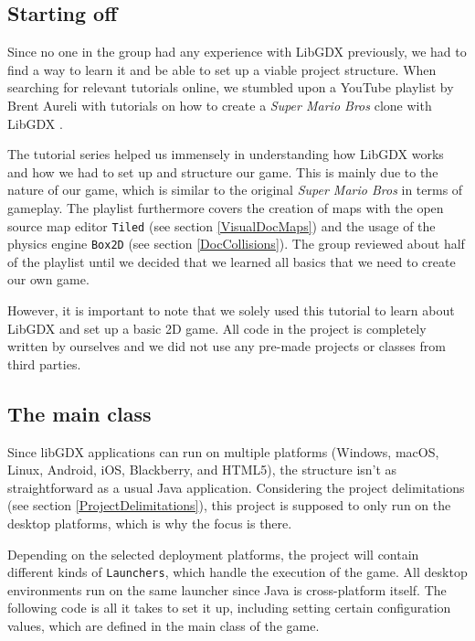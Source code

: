 \documentclass[12p]{article}
\begin{document}

\newpage
\subsection{Starting off}

Since no one in the group had any experience with LibGDX previously, we had to find a way to learn it and be able to set up a viable project structure. When searching for relevant tutorials online, we stumbled upon a YouTube playlist by Brent Aureli with tutorials on how to create a \emph{Super Mario Bros} \cite{SuperMarioBros} clone with LibGDX \cite{BrentAureliSuperMarioBros}.

The tutorial series helped us immensely in understanding how LibGDX works and how we had to set up and structure our game. This is mainly due to the nature of our game, which is similar to the original \emph{Super Mario Bros} in terms of gameplay. The playlist furthermore covers the creation of maps with the open source map editor \texttt{Tiled} (see section \ref{VisualDocMaps}) and the usage of the physics engine \texttt{Box2D} (see section \ref{DocCollisions}). The group reviewed about half of the playlist until we decided that we learned all basics that we need to create our own game.

However, it is important to note that we solely used this tutorial to learn about LibGDX and set up a basic 2D game. All code in the project is completely written by ourselves and we did not use any pre-made projects or classes from third parties.


\newpage
\subsection{The main class} \label{DocMainClass}

Since libGDX applications can run on multiple platforms (Windows, macOS, Linux, Android, iOS, Blackberry, and HTML5), the structure isn't as straightforward as a usual Java application. Considering the project delimitations (see section \ref{ProjectDelimitations}), this project is supposed to only run on the desktop platforms, which is why the focus is there.

Depending on the selected deployment platforms, the project will contain different kinds of \texttt{Launchers}, which handle the execution of the game. All desktop environments run on the same launcher since Java is cross-platform itself. The following code is all it takes to set it up, including setting certain configuration values, which are defined in the main class of the game.
\end{document}
